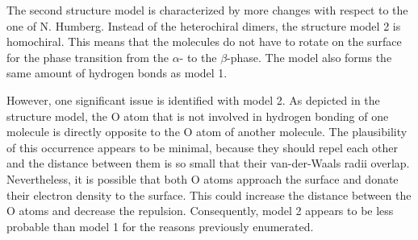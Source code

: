 The second structure model is characterized by more changes with respect to the one of N. Humberg.\autocite{Humberg2024} Instead of the heterochiral dimers, the structure model 2 is homochiral. This means that the molecules do not have to rotate on the surface for the phase transition from the $\alpha$- to the $\beta$-phase. The model also forms the same amount of hydrogen bonds as model 1.

However, one significant issue is identified with model 2. As depicted in the structure model, the O atom that is not involved in hydrogen bonding of one molecule is directly opposite to the O atom of another molecule. The plausibility of this occurrence appears to be minimal, because they should repel each other and the distance between them is so small that their van-der-Waals radii overlap. Nevertheless, it is possible that both O atoms approach the surface and donate their electron density to the surface. This could increase the distance between the O atoms and decrease the repulsion. Consequently, model 2 appears to be less probable than model 1 for the reasons previously enumerated.

\cleardoublepage